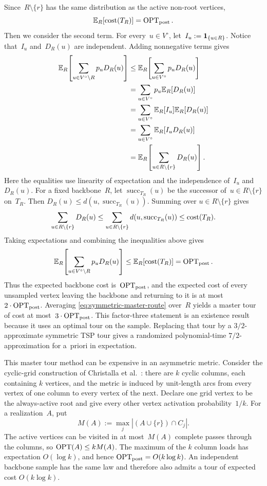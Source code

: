 \documentclass[12pt,a4paper,oneside]{report}
\begin{document}
Since~$R\setminus\{r\}$ has the same distribution as the active non-root
vertices,
\[
    \mathbb{E}_R[\operatorname{cost}(T_R)]=\operatorname{OPT}_\mathrm{post}.
\]
Then we consider the second term.
For every~$u\in V^\circ$, let~$I_u:=\mathbf{1}_{\{u\in R\}}$.  Notice that~$I_u$ and~$D_R(u)$
are independent.  Adding nonnegative terms gives
\begin{align*}
    \mathbb{E}_R\!\left[
      \sum_{u\in V^\circ\setminus R}p_uD_R(u)
    \right]
    &\le \mathbb{E}_R\!\left[
      \sum_{u\in V^\circ}p_uD_R(u)
    \right]\\
    &=\sum_{u\in V^\circ}p_u\mathbb{E}_R[D_R(u)]\\
    &=\sum_{u\in V^\circ}\mathbb{E}_R[I_u]\mathbb{E}_R[D_R(u)]\\
    &=\sum_{u\in V^\circ}\mathbb{E}_R[I_uD_R(u)]\\
    &=\mathbb{E}_R\!\left[\sum_{u\in R\setminus\{r\}}D_R(u)\right].
\end{align*}
Here the equalities use linearity of expectation and the independence
of~$I_u$ and~$D_R(u)$.  For a fixed backbone~$R$, let
$\operatorname{succ}_{T_R}(u)$ be the successor of~$u\in R\setminus\{r\}$
on~$T_R$.  Then $D_R(u)\le d(u,\operatorname{succ}_{T_R}(u))$.  Summing over
$u\in R\setminus\{r\}$ gives
\[
    \sum_{u\in R\setminus\{r\}}D_R(u)
    \le \sum_{u\in R\setminus\{r\}}d(u,\operatorname{succ}_{T_R}(u))
    \le \operatorname{cost}(T_R).
\]
Taking expectations and combining the inequalities above gives
\[
    \mathbb{E}_R\!\left[
      \sum_{u\in V^\circ\setminus R}p_uD_R(u)
    \right]
    \le \mathbb{E}_R[\operatorname{cost}(T_R)]
    =\operatorname{OPT}_\mathrm{post}.
\]
Thus the expected backbone cost is~$\operatorname{OPT}_\mathrm{post}$, and the expected
cost of every unsampled vertex leaving the backbone and returning to it is at most~$2\cdot\operatorname{OPT}_\mathrm{post}$.
Averaging \cref{eq:symmetric-master-route} over~$R$ yields a master tour of
cost at most~$3\cdot\operatorname{OPT}_\mathrm{post}$.  This factor-three statement is an existence result
because it uses an optimal tour on the sample.  Replacing that tour by a
$3/2$-approximate symmetric TSP tour gives a randomized polynomial-time
$7/2$-approximation for a~priori \StochTSP{} in expectation.

This master tour method can be expensive
in an asymmetric metric.  Consider the cyclic-grid construction of Christalla et
al.~\cite[Section~3.1]{Christalla2025}: there are $k$ cyclic columns, each
containing $k$ vertices, and the metric is induced by unit-length arcs from
every vertex of one column to every vertex of the next.  Declare one grid
vertex to be the always-active root and give every other vertex activation
probability~$1/k$.  For a realization~$A$, put
\[
    M(A):=\max_j |(A\cup\{r\})\cap C_j|.
\]
The active vertices can be visited in at most~$M(A)$ complete passes through
the columns, so $\operatorname{OPT}(A)\le kM(A)$.  The maximum of the $k$ column loads has
expectation $O(\log k)$, and hence $\operatorname{OPT}_\mathrm{post}=O(k\log k)$.  An independent
backbone sample has the same law and therefore also admits a tour of expected
cost $O(k\log k)$.
\end{document}

